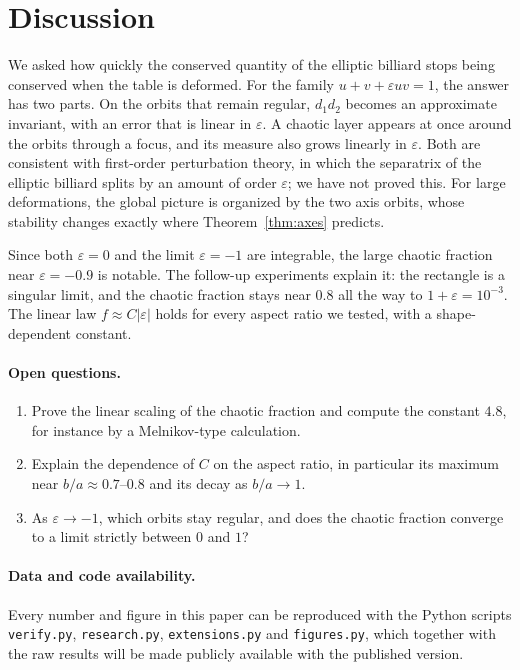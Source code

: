 \documentclass[11pt]{amsart}
\theoremstyle{remark}
\begin{document}
\section{Discussion}

We asked how quickly the conserved quantity of the elliptic billiard stops
being conserved when the table is deformed. For the family
$u + v + \varepsilon uv = 1$, the answer has two parts. On the orbits that
remain regular, $d_1d_2$ becomes an approximate invariant, with an error that
is linear in $\varepsilon$. A chaotic layer appears at once around the orbits
through a focus, and its measure also grows linearly in $\varepsilon$. Both
are consistent with first-order perturbation theory, in which the separatrix
of the elliptic billiard splits by an amount of order $\varepsilon$; we have
not proved this. For large deformations, the global picture is organized by
the two axis orbits, whose stability changes exactly where
Theorem~\ref{thm:axes} predicts.

Since both $\varepsilon = 0$ and the limit $\varepsilon = -1$ are integrable,
the large chaotic fraction near $\varepsilon = -0.9$ is notable. The
follow-up experiments explain it: the rectangle is a singular limit, and the
chaotic fraction stays near $0.8$ all the way to $1 + \varepsilon = 10^{-3}$.
The linear law $f \approx C|\varepsilon|$ holds for every aspect ratio we
tested, with a shape-dependent constant.

\paragraph{Open questions.}
\begin{enumerate}
  \item Prove the linear scaling of the chaotic fraction and compute the
  constant $4.8$, for instance by a Melnikov-type calculation.
  \item Explain the dependence of $C$ on the aspect ratio, in particular its
  maximum near $b/a \approx 0.7$--$0.8$ and its decay as $b/a \to 1$.
  \item As $\varepsilon \to -1$, which orbits stay regular, and does the
  chaotic fraction converge to a limit strictly between $0$ and $1$?
\end{enumerate}

\paragraph{Data and code availability.} Every number and figure in this paper
can be reproduced with the Python scripts \texttt{verify.py},
\texttt{research.py}, \texttt{extensions.py} and \texttt{figures.py}, which
together with the raw results will be made publicly available with the
published version.
\end{document}
